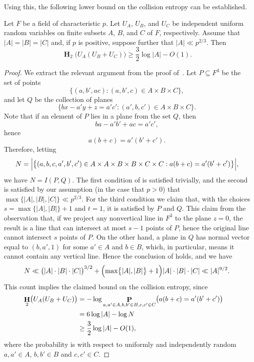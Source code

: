 \documentclass[twoside, 10pt]{article}
\DeclareMathOperator{\Eta}{\mathbf{H}}
\DeclareMathOperator{\pr}{\mathbf{P}}
\begin{document}
Using this, the following lower 
bound on the collision entropy
can be established.

\begin{lemma}\label{lemkohetal}
Let $F$ be a field of characteristic $p$.
Let $U_A$, $U_B$, and $U_C$ be independent uniform random 
variables on finite subsets
$A$, $B$, and $C$ of $F$, respectively. Assume that $|A|=|B|=|C|$
and, if $p$ is positive, suppose further that $|A| \ll p^{2/3}$.
Then
$$\Eta_2\bigl( U_A(U_B+U_C)\bigr) \ge \frac32\log|A| - O(1).$$
\end{lemma}

\begin{proof}
We extract the relevant argument from the proof 
of~\cite[Theorem~2.1]{kohetal2020}.
Let $P\subseteq F^3$ be the set of points
$$\bigl\{ (a, b', ac) : (a,b',c)\in A\times B \times C\bigr\},$$
and let $Q$ be the collection of planes
$$\bigl\{ bx - a'y + z = a'c' : (a', b, c')\in A\times B\times C\bigr\}.$$
Note that if an element of $P$ lies in a plane from the set $Q$, then
$$ba - a'b' + ac = a'c',$$
hence
$$a(b+c) = a'(b'+c').$$
Therefore, letting
$$N = \Bigl|\bigl\{ (a,b,c,a',b',c')\in A\times A\times B\times B\times C\times C : a(b+c) = a'(b'+c')\bigr\}\Bigr|,$$
we have $N = I(P,Q)$. The first condition of  is 
satisfied trivially, and the second is satisfied by our assumption 
(in the case that $p>0$) that $\max\bigl\{ |A|, |B|, |C|\bigr\} \ll p^{2/3}$. 
For the third condition we claim that, with the choices 
$s = \max\bigl\{|A|, |B|\bigr\}+1$ and $t=1$, it is satisfied by $P$ and $Q$.
This claim from the observation that, if we project any nonvertical line 
in $F^3$ to the plane $z=0$, the result is a line that can intersect at 
most $s-1$ points of $P$, hence the original line cannot intersect 
$s$ points of $P$. On the other hand, a plane in $Q$ has normal vector 
equal to $(b, a', 1)$ for some $a'\in A$ and $b\in B$, which, in particular,
means it cannot contain any vertical line. Hence the conclusion 
of  holds, and we have
$$N \ll \bigl( |A|\cdot |B|\cdot |C|\bigr)^{3/2} + \Bigl(\max\bigl\{|A|, |B|\bigr\} +1\Bigr) |A|\cdot |B|\cdot |C| \ll |A|^{9/2}.$$
This count implies the claimed bound on the collision entropy, since
\begin{equation}\begin{aligned}
\Eta_2\bigl( U_A(U_B+U_C)\bigr)
&= -\log \pr_{a,a'\in A, b,b'\in B, c,c'\in C}
\bigl( a(b+c) = a'(b'+c') \bigr)\cr
&=  6 \log|A| - \log N\cr
&\ge \frac32 \log |A| - O(1), 
\end{aligned}\end{equation}
where the probability is with respect to uniformly and independently
random 
$a,a'\in A$, $b,b'\in B$ and $c,c'\in C$.
\end{proof}
\end{document}
